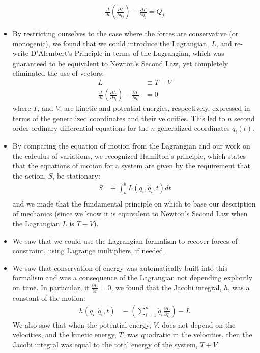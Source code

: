\documentclass[10pt]{report}
\newcommand{\die}[2]{\frac{\partial #1}{\partial #2}}
\begin{document}
\begin{itemize}
\begin{align*}
\frac{d}{dt}\left(\frac{\partial T}{\partial \dot{q}_j} \right) - \frac{\partial T}{\partial q_j}=Q_j
\end{align*}
\item By restricting ourselves to the case where the forces are conservative (or monogenic), we found that we could introduce the Lagrangian, $L$, and re-write D'Alembert's Principle in terms of the Lagrangian, which was guaranteed to be equivalent to Newton's Second Law, yet completely eliminated the use of vectors:
\begin{align*}
L&\equiv T - V \\
\frac{d}{dt}\left(\frac{\partial L}{\partial \dot{q}_i}\right)-\frac{\partial L}{\partial q_i}&=0 
\end{align*}
where $T$, and $V$, are kinetic and potential energies, respectively, expressed in terms of the generalized coordinates and their velocities. This led to $n$ second order ordinary differential equations for the $n$ generalized coordinates $q_i(t)$.
\item By comparing the equation of motion from the Lagrangian and our work on the calculus of variations, we recognized Hamilton's principle, which states that the equations of motion for a system are given by the requirement that the action, $S$, be stationary:
\begin{align*}
S&\equiv \int_a^b L(q_i,\dot q_i, t)dt\\
\end{align*}
and we made that the fundamental principle on which to base our description of mechanics (since we know it is equivalent to Newton's Second Law when the Lagrangian $L$ is $T-V$).
\item We saw that we could use the Lagrangian formalism to recover forces of constraint, using Lagrange multipliers, if needed.
\item We saw that conservation of energy was automatically built into this formalism and was a consequence of the Lagrangian not depending explicitly on time. In particular, if $\die{L}{t}=0$, we found that the Jacobi integral, $h$, was a constant of the motion:
\begin{align*}
h(q_i, \dot{q}_i, t)&\equiv \left(\sum_{i=1}^n \dot{q}_i\frac{\partial L}{\partial \dot{q}_i}\right) -L
\end{align*}
We also saw that when the potential energy, $V$, does not depend on the velocities, and the kinetic energy, $T$, was quadratic in the velocities, then the Jacobi integral was equal to the total energy of the system, $T+V$.

\end{itemize}
\end{document}
